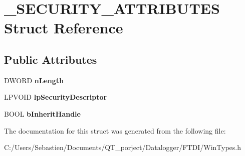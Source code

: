 \hypertarget{struct___s_e_c_u_r_i_t_y___a_t_t_r_i_b_u_t_e_s}{}\section{\+\_\+\+S\+E\+C\+U\+R\+I\+T\+Y\+\_\+\+A\+T\+T\+R\+I\+B\+U\+T\+ES Struct Reference}
\label{struct___s_e_c_u_r_i_t_y___a_t_t_r_i_b_u_t_e_s}
\subsection*{Public Attributes}
\begin{DoxyCompactItemize}
\item 
\mbox{\label{struct___s_e_c_u_r_i_t_y___a_t_t_r_i_b_u_t_e_s_a3ec25c40b65a92b164177b0b230abda9}} 
D\+W\+O\+RD {\bfseries n\+Length}
\item 
\mbox{\label{struct___s_e_c_u_r_i_t_y___a_t_t_r_i_b_u_t_e_s_a90d1d49f7d2d50b24cc74c5060ae6204}} 
L\+P\+V\+O\+ID {\bfseries lp\+Security\+Descriptor}
\item 
\mbox{\label{struct___s_e_c_u_r_i_t_y___a_t_t_r_i_b_u_t_e_s_a8d91cd71bb0dfe51061c2412849dff98}} 
B\+O\+OL {\bfseries b\+Inherit\+Handle}
\end{DoxyCompactItemize}


The documentation for this struct was generated from the following file\+:\begin{DoxyCompactItemize}
\item 
C\+:/\+Users/\+Sebastien/\+Documents/\+Q\+T\+\_\+porject/\+Datalogger/\+F\+T\+D\+I/Win\+Types.\+h\end{DoxyCompactItemize}
